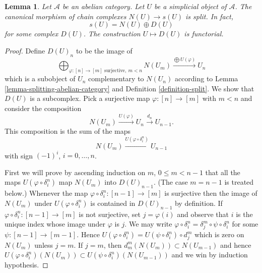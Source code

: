 \documentclass{amsart}
\theoremstyle{plain}
\newtheorem{lemma}[subsection]{Lemma}
\theoremstyle{definition}
\theoremstyle{remark}
\numberwithin{equation}{subsection}
\begin{document}
\begin{lemma}
\label{lemma-decompose-associated-complexes}
Let $\mathcal{A}$ be an abelian category.
Let $U$ be a simplicial object of $\mathcal{A}$.
The canonical morphism of chain complexes
$N(U) \to s(U)$ is split. In fact,
$$
s(U) = N(U) \oplus D(U)
$$
for some complex $D(U)$. The construction $U \mapsto D(U)$
is functorial.
\end{lemma}

\begin{proof}
Define $D(U)_n$ to be the image of
$$
\bigoplus\nolimits_{\varphi : [n] \to [m]\text{ surjective}, \ m < n} N(U_m)
\xrightarrow{\bigoplus U(\varphi)}
U_n
$$
which is a subobject of $U_n$ complementary to
$N(U_n)$ according to Lemma \ref{lemma-splitting-abelian-category} and
Definition \ref{definition-split}. We show that
$D(U)$ is a subcomplex. Pick a surjective
map $\varphi : [n] \to [m]$ with $m < n$ and consider
the composition
$$
N(U_m) \xrightarrow{U(\varphi)} U_n \xrightarrow{d_n} U_{n - 1}.
$$
This composition is the sum of the maps
$$
N(U_m) \xrightarrow{U(\varphi \circ \delta^n_i)} U_{n - 1}
$$
with sign $(-1)^i$, $i = 0, \ldots, n$.

\medskip\noindent
First we will prove by ascending induction on $m$,
$0 \leq m < n - 1$ that all the maps $U(\varphi \circ \delta^n_i)$
map $N(U_m)$ into $D(U)_{n - 1}$. (The case $m = n - 1$ is treated below.)
Whenever the map $\varphi \circ \delta^n_i : [n - 1] \to [m]$
is surjective then the image of $N(U_m)$ under $U(\varphi \circ \delta^n_i)$
is contained in $D(U)_{n - 1}$ by definition.
If $\varphi \circ \delta^n_i : [n - 1] \to [m]$ is not surjective,
set $j = \varphi(i)$ and observe that $i$ is the unique
index whose image under $\varphi$ is $j$. We may write
$\varphi \circ \delta^n_i = \delta^m_j \circ \psi \circ \delta^n_i$
for some $\psi : [n - 1] \to [m - 1]$. Hence
$U(\varphi \circ \delta^n_i) = U(\psi \circ \delta^n_i) \circ d^m_j$ which
is zero on $N(U_m)$ unless $j = m$. If $j = m$, then
$d^m_m(N(U_m)) \subset N(U_{m - 1})$ and hence
$U(\varphi \circ \delta^n_i)(N(U_m)) \subset
U(\psi \circ \delta^n_i)(N(U_{m - 1}))$ and we win
by induction hypothesis.


\end{proof}
\end{document}
